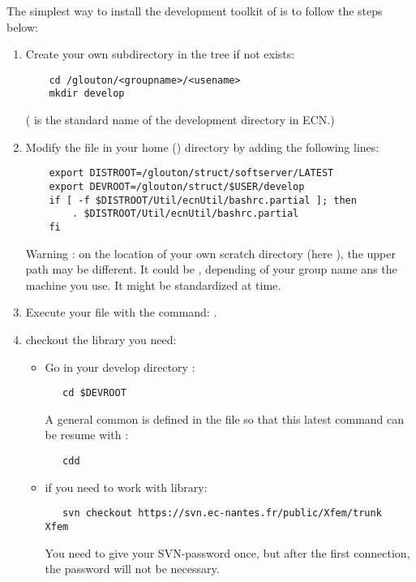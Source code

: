 The simplest way to install the development toolkit of 
is to follow the steps below:

\begin{enumerate}
\item Create your own subdirectory in the  tree if not exists:

    \begin{verbatim}
    cd /glouton/<groupname>/<usename>
    mkdir develop
    \end{verbatim}
( is the standard name of the development directory in
ECN.)

\item Modify the  file in your home () directory by adding the following lines:
    \begin{verbatim}
    export DISTROOT=/glouton/struct/softserver/LATEST
    export DEVROOT=/glouton/struct/$USER/develop
    if [ -f $DISTROOT/Util/ecnUtil/bashrc.partial ]; then
        . $DISTROOT/Util/ecnUtil/bashrc.partial
    fi
    \end{verbatim}
    Warning : on the location of your own scratch directory (here  ), the upper path may be different. It could
    be , depending of your group name  ans the machine you use.
    It might be standardized at time.  


\item Execute your  file with the command: . 



\item checkout the library you need:
    \begin{itemize}
        \item Go in your develop directory :
        \begin{verbatim}
   cd $DEVROOT
        \end{verbatim} 
	A general common  is defined in the file  so that this latest command can be resume with :
        \begin{verbatim}
   cdd
        \end{verbatim} 
	
        \item if you need to work with    library:
        \begin{verbatim}
   svn checkout https://svn.ec-nantes.fr/public/Xfem/trunk  Xfem
        \end{verbatim}         You  need to give your SVN-password once, but after the first connection, the password will not be necessary. \\


\end{itemize}
\end{enumerate}
